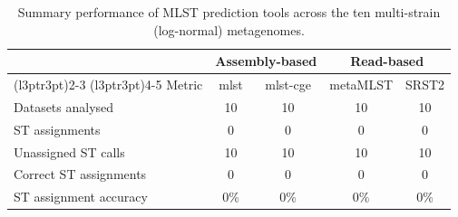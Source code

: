 \begin{table}[!ht]
\centering
\caption{Summary performance of MLST prediction tools across the ten multi-strain (log-normal) metagenomes.}
\label{tab:MLST_summary_rare}

\begin{tabular}[t]{lcccc}
\toprule
\multicolumn{1}{c}{ } & \multicolumn{2}{c}{Assembly-based} & \multicolumn{2}{c}{Read-based} \\
\cmidrule(l{3pt}r{3pt}){2-3} \cmidrule(l{3pt}r{3pt}){4-5}
Metric & mlst & mlst-cge & metaMLST & SRST2\\
\midrule
Datasets analysed & 10 & 10 & 10 & 10\\
ST assignments & 0 & 0 & 0 & 0\\
Unassigned ST calls & 10 & 10 & 10 & 10\\
Correct ST assignments & 0 & 0 & 0 & 0\\
ST assignment accuracy & 0\% & 0\% & 0\% & 0\%\\
\bottomrule
\end{tabular}
\end{table}
